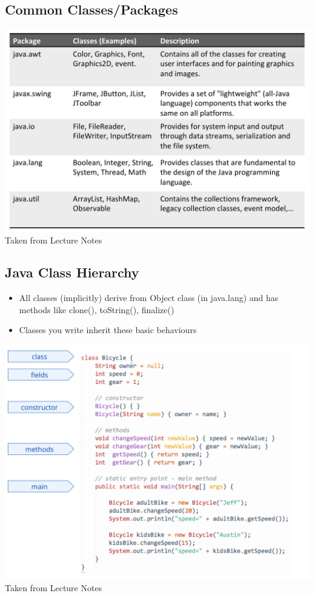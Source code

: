 \documentclass[twoside]{article}
\begin{document}
\subsection{Common Classes/Packages}
\begin{center}
\includegraphics[scale=0.2]{11}\\
Taken from Lecture Notes
\end{center}

\subsection{Java Class Hierarchy}
\begin{itemize}
\item All classes (implicitly) derive from Object class (in java.lang) and has methods like clone(), toString(), finalize()
\item Classes you write inherit these basic behaviours
\end{itemize} 

\begin{center}
\includegraphics[scale=0.2]{12}\\
Taken from Lecture Notes
\end{center}
\end{document}
